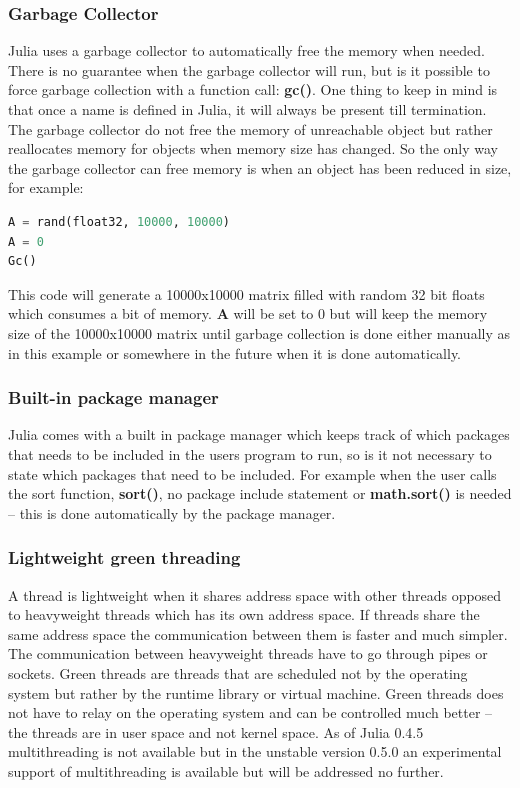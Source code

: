 \documentclass[a4paper,11pt]{article}
\begin{document}
\subsubsection{Garbage Collector}

Julia uses a garbage collector to automatically free the memory when needed. There is no guarantee when the garbage collector will run, but is it possible to force garbage collection with a function call: \textbf{gc()}. One thing to keep in mind is that once a name is defined in Julia, it will always be present till termination. The garbage collector do not free the memory of unreachable object but rather reallocates memory for objects when memory size has changed. So the only way the garbage collector can free memory is when an object has been reduced in size, for example:

\begin{lstlisting}[language=python]
A = rand(float32, 10000, 10000) 
A = 0
Gc() 
\end{lstlisting}
This code will generate a 10000x10000 matrix filled with random 32 bit floats which consumes a bit of memory. \textbf{A} will be set to 0 but will keep the memory size of the 10000x10000 matrix until garbage collection is done either manually as in this example or somewhere in the future when it is done automatically. 

\subsubsection{Built-in package manager}
Julia comes with a built in package manager which keeps track of which packages that needs to be included in the users program to run, so is it not necessary to state which packages that need to be included. For example when the user calls the sort function, \textbf{sort()}, no package include statement or \textbf{math.sort()} is needed – this is done automatically by the package manager.

\subsubsection{Lightweight green threading}
A thread is lightweight when it shares address space with other threads opposed to heavyweight threads which has its own address space. If threads share the same address space the communication between them is faster and much simpler. The communication between heavyweight threads have to go through pipes or sockets. Green threads are threads that are scheduled not by the operating system but rather by the runtime library or virtual machine. Green threads does not have to relay on the operating system and can be controlled much better – the threads are in user space and not kernel space. As of Julia 0.4.5 multithreading is not available but in the unstable version 0.5.0 an experimental support of multithreading is available but will be addressed no further. 
\end{document}
